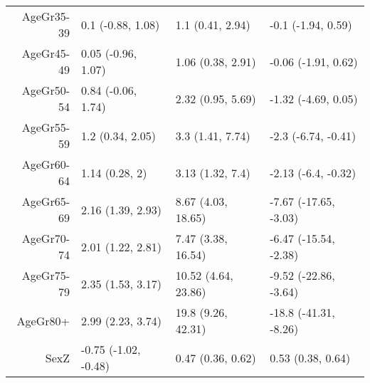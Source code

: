 \begin{table}[ht]
\begin{tabular}{rlll}
  AgeGr35-39 & 0.1 (-0.88, 1.08) & 1.1 (0.41, 2.94) & -0.1 (-1.94, 0.59) \\ 
  AgeGr45-49 & 0.05 (-0.96, 1.07) & 1.06 (0.38, 2.91) & -0.06 (-1.91, 0.62) \\ 
  AgeGr50-54 & 0.84 (-0.06, 1.74) & 2.32 (0.95, 5.69) & -1.32 (-4.69, 0.05) \\ 
  AgeGr55-59 & 1.2 (0.34, 2.05) & 3.3 (1.41, 7.74) & -2.3 (-6.74, -0.41) \\ 
  AgeGr60-64 & 1.14 (0.28, 2) & 3.13 (1.32, 7.4) & -2.13 (-6.4, -0.32) \\ 
  AgeGr65-69 & 2.16 (1.39, 2.93) & 8.67 (4.03, 18.65) & -7.67 (-17.65, -3.03) \\ 
  AgeGr70-74 & 2.01 (1.22, 2.81) & 7.47 (3.38, 16.54) & -6.47 (-15.54, -2.38) \\ 
  AgeGr75-79 & 2.35 (1.53, 3.17) & 10.52 (4.64, 23.86) & -9.52 (-22.86, -3.64) \\ 
  AgeGr80+ & 2.99 (2.23, 3.74) & 19.8 (9.26, 42.31) & -18.8 (-41.31, -8.26) \\ 
  SexZ & -0.75 (-1.02, -0.48) & 0.47 (0.36, 0.62) & 0.53 (0.38, 0.64) \\ 
   \hline
\end{tabular}
\end{table}
